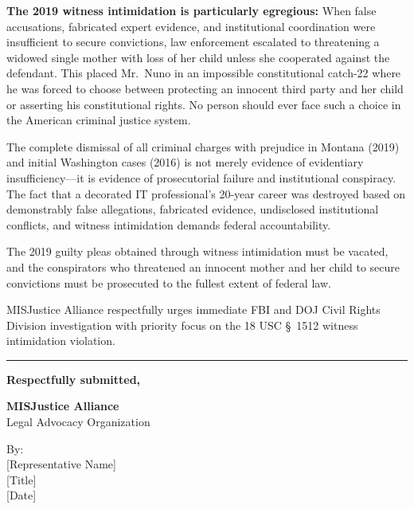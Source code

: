 \documentclass[11pt, letterpaper]{article}
\begin{document}
\textbf{The 2019 witness intimidation is particularly egregious:} When false accusations, fabricated expert evidence, and institutional coordination were insufficient to secure convictions, law enforcement escalated to threatening a widowed single mother with loss of her child unless she cooperated against the defendant. This placed Mr.\ Nuno in an impossible constitutional catch-22 where he was forced to choose between protecting an innocent third party and her child or asserting his constitutional rights. No person should ever face such a choice in the American criminal justice system.

The complete dismissal of all criminal charges with prejudice in Montana (2019) and initial Washington cases (2016) is not merely evidence of evidentiary insufficiency---it is evidence of prosecutorial failure and institutional conspiracy. The fact that a decorated IT professional's 20-year career was destroyed based on demonstrably false allegations, fabricated evidence, undisclosed institutional conflicts, and witness intimidation demands federal accountability.

The 2019 guilty pleas obtained through witness intimidation must be vacated, and the conspirators who threatened an innocent mother and her child to secure convictions must be prosecuted to the fullest extent of federal law.

MISJustice Alliance respectfully urges immediate FBI and DOJ Civil Rights Division investigation with priority focus on the 18 USC \S\ 1512 witness intimidation violation.

\vspace{0.4in}

\noindent\rule{\textwidth}{0.4pt}

\vspace{0.2in}

\noindent
\textbf{Respectfully submitted,}

\vspace{0.3in}

\noindent
\textbf{MISJustice Alliance}\\
Legal Advocacy Organization

\vspace{0.3in}

\noindent
By: \underline{\hspace{2.5in}}\\
{[Representative Name]}\\
{[Title]}\\
{[Date]}
\end{document}
